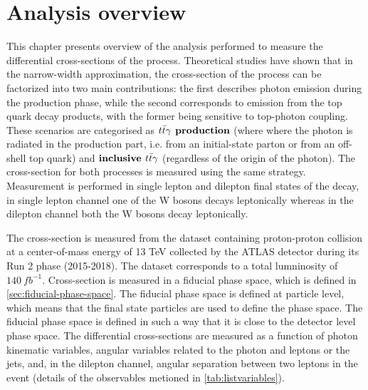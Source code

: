 \chapter{Analysis overview}
\label{analysis_overview}
This chapter presents overview of the analysis performed to measure the differential cross-sections of the \tty process. Theoretical studies have shown that in the narrow-width approximation, the cross-section of the \tty process can be factorized into two main contributions: the first describes photon emission during the production phase, while the second corresponds to emission from the top quark decay products, with the former being sensitive to top-photon coupling. These scenarios are categorised as $\textbf{\tty production}$ (where where the photon is radiated in the production part, i.e. from an initial-state parton or from an off-shell top quark) and $\textbf{inclusive $t\bar{t}\gamma$}$ (regardless of the origin of the photon). The cross-section for both processes is measured using the same strategy. Measurement is performed in single lepton and dilepton final states of the \ttbar decay, in single lepton channel one of the W bosons decays leptonically whereas in the dilepton channel both the W bosons decay leptonically. 

The cross-section is measured from the dataset containing proton-proton collision at a center-of-mass energy of 13 TeV collected by the ATLAS detector during its Run 2 phase (2015-2018). The dataset corresponds to a total lumninosity of $140 \ fb^{-1}$. Cross-section is measured in a fiducial phase space, which is defined in \cref{sec:fiducial-phase-space}. The fiducial phase space is defined at particle level, which means that the final state particles are used to define the phase space. The fiducial phase space is defined in such a way that it is close to the detector level phase space. The differential cross-sections are measured as a function of photon kinematic variables, angular variables related to the photon and leptons or the jets, and, in the dilepton channel, angular separation between two leptons in the event (details of the observables metioned in \cref{tab:listvariables}).


